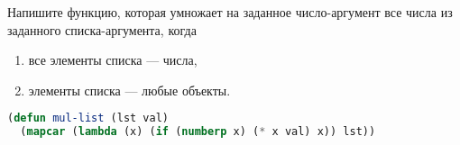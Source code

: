 Напишите функцию, которая умножает на заданное число-аргумент все числа из
заданного списка-аргумента, когда
\begin{enumerate}
    \item все элементы списка --- числа,
    \item элементы списка --- любые объекты.
\end{enumerate}

\begin{lstlisting}[language=Lisp]
(defun mul-list (lst val)
  (mapcar (lambda (x) (if (numberp x) (* x val) x)) lst))
\end{lstlisting}

